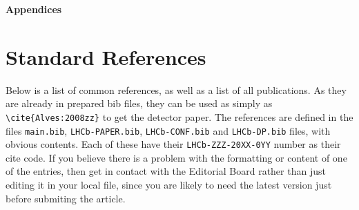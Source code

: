 
\clearpage

{\noindent\bf\Large Appendices}

\appendix

\section{Standard References}
\label{sec:StandardReferences}
Below is a list of common references, as
well as a list of all \lhcb publications. 
As they are already in prepared bib files, they can be used as simply as
\texttt{\textbackslash cite\{Alves:2008zz\}} to get the \lhcb detector paper. 
The references are defined in the files \texttt{main.bib},  \texttt{LHCb-PAPER.bib}, \texttt{LHCb-CONF.bib} and \texttt{LHCb-DP.bib} files, with obvious contents.
Each of these have their {\tt LHCb-ZZZ-20XX-0YY} number as their cite code.
If you believe there is a problem with the formatting or
content of one of the entries, then get in contact with the Editorial
Board rather than just editing it in your local file,
since you are likely to need the latest version just before submiting the article.

